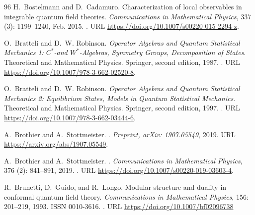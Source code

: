 \documentclass[a4paper, 11pt]{article}
\DeclareMathOperator{\1}{\mathds{1}}
\providecommand{\DIFaddtex}[1]{{\protect\color{blue}\uwave{#1}}} %
\providecommand{\DIFaddbegin}{} %
\providecommand{\DIFadd}[1]{\texorpdfstring{\DIFaddtex{#1}}{#1}} %
\providecommand{\DIFaddincludegraphics}[2][]{{\color{blue}\fbox{\DIFOincludegraphics[#1]{#2}}}} %
\DeclareRobustCommand{\DIFaddbegin}{\DIFOaddbegin \let\includegraphics\DIFaddincludegraphics} %
\begin{document}
\begin{thebibliography}{96}
H.~Bostelmann and D.~Cadamuro.
\newblock Characterization of local observables in integrable quantum field
  theories.
\newblock \emph{Communications in Mathematical Physics}, 337
  (3): 1199--1240, Feb. 2015.
\newblock {}.
\newblock URL \url{https://doi.org/10.1007/s00220-015-2294-z}.

O.~{B}ratteli and D.~W. {R}obinson.
\newblock \emph{{O}perator {A}lgebras and {Q}uantum {S}tatistical {M}echanics
  1: ${C}^{*}$-and ${W}^{*}$-{A}lgebras, {S}ymmetry {G}roups, {D}ecomposition
  of {S}tates}.
\newblock Theoretical and Mathematical Physics. {S}pringer, second edition,
  1987.
\newblock {}.
\newblock URL \url{https://doi.org/10.1007/978-3-662-02520-8}.

O.~{B}ratteli and D.~W. {R}obinson.
\newblock \emph{{O}perator {A}lgebras and {Q}uantum {S}tatistical {M}echanics
  2: {E}quilibrium {S}tates, {M}odels in {Q}uantum {S}tatistical {M}echanics}.
\newblock Theoretical and Mathematical Physics. {S}pringer, second edition,
  1997.
\newblock {}.
\newblock URL \url{https://doi.org/10.1007/978-3-662-03444-6}.

A.~Brothier and A.~Stottmeister.
.
\newblock \emph{Preprint, arXiv: 1907.05549}, 2019{}.
\newblock URL \url{https://arxiv.org/abs/1907.05549}.

A.~Brothier and A.~Stottmeister.
.
\newblock \emph{Communications in Mathematical Physics}, 376
  (2): 841--891, 2019{}.
\newblock {}.
\newblock URL \url{https://doi.org/10.1007/s00220-019-03603-4}.

R.~Brunetti, D.~Guido, and R.~Longo.
\newblock Modular structure and duality in conformal quantum field theory.
\newblock \emph{Communications in Mathematical Physics}, 156:
  201--219, 1993.
\newblock ISSN 0010-3616.
\newblock {}.
\newblock URL \url{https://doi.org/10.1007/bf02096738}\DIFaddbegin \DIFadd{.
}


\end{thebibliography}
\end{document}
